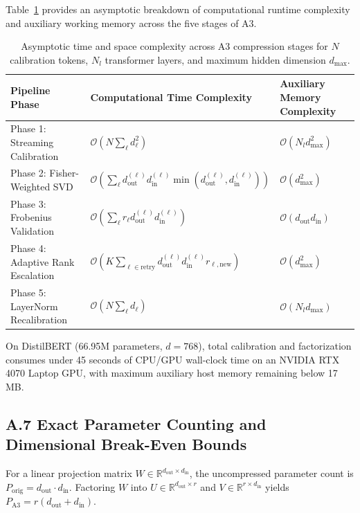 Table~\ref{tab:complexity_analysis} provides an asymptotic breakdown of computational runtime complexity and auxiliary working memory across the five stages of A3.

\begin{table}[H]
\centering
\small
\begin{tabular}{lll}
\toprule
\textbf{Pipeline Phase} & \textbf{Computational Time Complexity} & \textbf{Auxiliary Memory Complexity} \\
\midrule
Phase 1: Streaming Calibration & $\mathcal{O}(N \sum_\ell d_\ell^2)$ & $\mathcal{O}(N_l d_\text{max}^2)$ \\
Phase 2: Fisher-Weighted SVD & $\mathcal{O}(\sum_\ell d_\text{out}^{(\ell)} d_\text{in}^{(\ell)} \min(d_\text{out}^{(\ell)}, d_\text{in}^{(\ell)}))$ & $\mathcal{O}(d_\text{max}^2)$ \\
Phase 3: Frobenius Validation & $\mathcal{O}(\sum_\ell r_\ell d_\text{out}^{(\ell)} d_\text{in}^{(\ell)})$ & $\mathcal{O}(d_\text{out} d_\text{in})$ \\
Phase 4: Adaptive Rank Escalation & $\mathcal{O}(K \sum_{\ell \in \text{retry}} d_\text{out}^{(\ell)} d_\text{in}^{(\ell)} r_{\ell,\text{new}})$ & $\mathcal{O}(d_\text{max}^2)$ \\
Phase 5: LayerNorm Recalibration & $\mathcal{O}(N \sum_\ell d_\ell)$ & $\mathcal{O}(N_l d_\text{max})$ \\
\bottomrule
\end{tabular}
\caption{Asymptotic time and space complexity across A3 compression stages for $N$ calibration tokens, $N_l$ transformer layers, and maximum hidden dimension $d_\text{max}$.}
\label{tab:complexity_analysis}
\end{table}

On DistilBERT (66.95M parameters, $d=768$), total calibration and factorization consumes under 45 seconds of CPU/GPU wall-clock time on an NVIDIA RTX 4070 Laptop GPU, with maximum auxiliary host memory remaining below 17 MB.

\subsection{A.7 Exact Parameter Counting and Dimensional Break-Even Bounds}
\label{sec:app_parameter_counting}

For a linear projection matrix $W \in \mathbb{R}^{d_\text{out} \times d_\text{in}}$, the uncompressed parameter count is $P_\text{orig} = d_\text{out} \cdot d_\text{in}$. Factoring $W$ into $U \in \mathbb{R}^{d_\text{out} \times r}$ and $V \in \mathbb{R}^{r \times d_\text{in}}$ yields $P_\text{A3} = r(d_\text{out} + d_\text{in})$.

